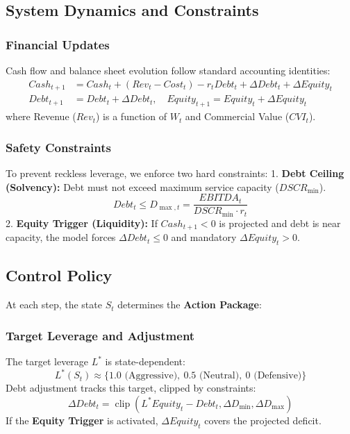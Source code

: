 \documentclass{mcmthesis}
\begin{document}
\subsection{System Dynamics and Constraints}
\subsubsection{Financial Updates}
Cash flow and balance sheet evolution follow standard accounting identities:
\begin{align}
    Cash_{t+1} &= Cash_t + (Rev_t - Cost_t) - r_t Debt_t + \Delta Debt_t + \Delta Equity_t \\
    Debt_{t+1} &= Debt_t + \Delta Debt_t, \quad Equity_{t+1} = Equity_t + \Delta Equity_t
\end{align}
where Revenue ($Rev_t$) is a function of $W_t$ and Commercial Value ($CVI_t$).

\subsubsection{Safety Constraints}
To prevent reckless leverage, we enforce two hard constraints:
1.  \textbf{Debt Ceiling (Solvency):} Debt must not exceed maximum service capacity ($DSCR_{\min}$).
    \begin{equation}
        Debt_t \le D_{\max,t} = \frac{EBITDA_t}{DSCR_{\min} \cdot r_t}
    \end{equation}
2.  \textbf{Equity Trigger (Liquidity):} If $Cash_{t+1} < 0$ is projected and debt is near capacity, the model forces $\Delta Debt_t \le 0$ and mandatory $\Delta Equity_t > 0$.

\subsection{Control Policy}
At each step, the state $S_t$ determines the \textbf{Action Package}:

\subsubsection{Target Leverage and Adjustment}
The target leverage $L^*$ is state-dependent:
\begin{equation}
L^*(S_t) \approx \{1.0 \text{ (Aggressive)}, \ 0.5 \text{ (Neutral)}, \ 0 \text{ (Defensive)}\}
\end{equation}
Debt adjustment tracks this target, clipped by constraints:
\begin{equation}
\Delta Debt_t = \operatorname{clip}(L^* Equity_t - Debt_t, \Delta D_{\min}, \Delta D_{\max})
\end{equation}
If the \textbf{Equity Trigger} is activated, $\Delta Equity_t$ covers the projected deficit.
\end{document}
